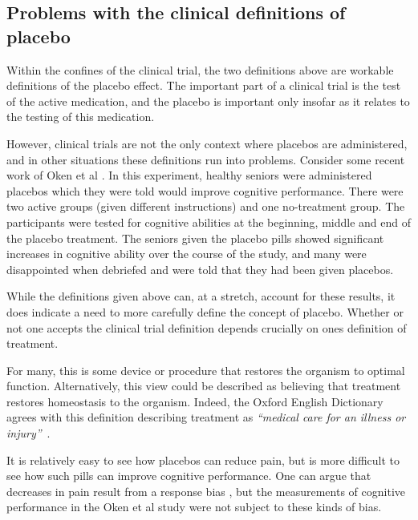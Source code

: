 \subsection{Problems with the clinical definitions of placebo}
\label{sec:plac-cogn-perf}

Within the confines of the clinical trial, the two definitions above are workable definitions of the placebo effect. The important part of a clinical trial is the test of the active medication, and the placebo is important only insofar as it relates to the testing of this medication. 

However, clinical trials are not the only context where placebos are administered, and in other situations these definitions run into problems. Consider some recent work of Oken et al \cite{Oken2008}. In this experiment, healthy seniors were administered placebos which they were told would improve cognitive performance. There were two active groups (given different instructions) and one no-treatment group. The participants were tested for cognitive abilities at the beginning, middle and end of the placebo treatment.  The seniors given the placebo pills showed significant increases in cognitive ability over the course of the study, and many were disappointed when debriefed and were told that they had been given placebos.

While the definitions given above can, at a stretch, account for these results, it does indicate a need to more carefully define the concept of placebo. Whether or not one accepts the clinical trial definition depends crucially on ones definition of treatment. 

For many, this is some device or procedure that restores the organism to optimal function. Alternatively, this view could be described as believing that treatment restores homeostasis to the organism. Indeed, the Oxford English Dictionary agrees with this definition describing treatment as \textit{``medical care for an illness or injury''}~\cite{dictionary20101989}.


It is relatively easy to see how placebos can reduce pain, but is more difficult to see how such pills can improve cognitive performance. One can argue that decreases in pain result from a response bias \cite{Allan2002}, but the measurements of cognitive performance in the Oken et al study were not subject to these kinds of bias. 

